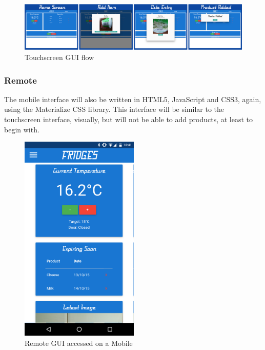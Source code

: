 \documentclass[10pt]{article}
\begin{document}
\begin{figure}[h]
\centering
\caption{Touchscreen GUI flow}
\label{Touchscreen GUI flow}
\includegraphics[width=18cm]{images/GUI-flow.png}
\end{figure}


\subsubsection{Remote}

The mobile interface will also be written in HTML5, JavaScript and CSS3, again, using the Materialize CSS library. This interface will be similar to the touchscreen interface, visually, but will not be able to add products, at least to begin with.

\begin{figure}[h]
\centering
\caption{Remote GUI accessed on a Mobile}
\label{Remote GUI accessed on a Mobile}
\includegraphics[height=10cm]{images/Mobile-Screenshot.png}
\end{figure}
\end{document}
